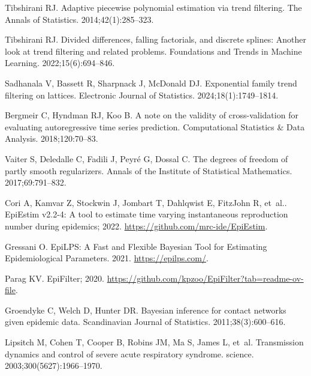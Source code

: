 \documentclass[10pt,letterpaper]{article}
\begin{document}
\begin{thebibliography}{10}
  Tibshirani RJ.
  \newblock Adaptive piecewise polynomial estimation via trend filtering.
  \newblock The Annals of Statistics. 2014;42(1):285--323.
  
  Tibshirani RJ.
  \newblock Divided differences, falling factorials, and discrete splines:
    Another look at trend filtering and related problems.
  \newblock Foundations and Trends{\textregistered} in Machine Learning.
    2022;15(6):694--846.
  
  Sadhanala V, Bassett R, Sharpnack J, McDonald DJ.
  \newblock Exponential family trend filtering on lattices.
  \newblock Electronic Journal of Statistics. 2024;18(1):1749--1814.
  
  Bergmeir C, Hyndman RJ, Koo B.
  \newblock A note on the validity of cross-validation for evaluating
    autoregressive time series prediction.
  \newblock Computational Statistics \& Data Analysis. 2018;120:70--83.
  
  Vaiter S, Deledalle C, Fadili J, Peyr{\'e} G, Dossal C.
  \newblock The degrees of freedom of partly smooth regularizers.
  \newblock Annals of the Institute of Statistical Mathematics. 2017;69:791--832.
  
  Cori A, Kamvar Z, Stockwin J, Jombart T, Dahlqwist E, FitzJohn R, et~al..
    {EpiEstim v2.2-4: A tool to estimate time varying instantaneous reproduction
    number during epidemics}; 2022.
  \newblock \url{https://github.com/mrc-ide/EpiEstim}.
  
  Gressani O. {EpiLPS: {A} {F}ast and {F}lexible {B}ayesian {T}ool for
    {E}stimating {E}pidemiological {P}arameters.} 2021.
  \newblock \url{https://epilps.com/}.
  
  Parag KV. {EpiFilter}; 2020.
  \newblock \url{https://github.com/kpzoo/EpiFilter?tab=readme-ov-file}.
  
  Groendyke C, Welch D, Hunter DR.
  \newblock Bayesian inference for contact networks given epidemic data.
  \newblock Scandinavian Journal of Statistics. 2011;38(3):600--616.
  
  Lipsitch M, Cohen T, Cooper B, Robins JM, Ma S, James L, et~al.
  \newblock Transmission dynamics and control of severe acute respiratory
    syndrome.
  \newblock science. 2003;300(5627):1966--1970.
  

\end{thebibliography}
\end{document}

